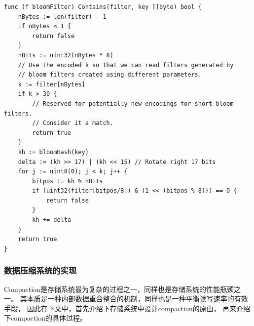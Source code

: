 \begin{enumerate}
\begin{lstlisting}[caption=Contain , label=code_radds_storage_tfile]
func (f bloomFilter) Contains(filter, key []byte) bool {
	nBytes := len(filter) - 1
	if nBytes < 1 {
	    return false
	}
	nBits := uint32(nBytes * 8)
	// Use the encoded k so that we can read filters generated by
	// bloom filters created using different parameters.
	k := filter[nBytes]
	if k > 30 {
	    // Reserved for potentially new encodings for short bloom filters.
	    // Consider it a match.
	    return true
	}
	kh := bloomHash(key)
	delta := (kh >> 17) | (kh << 15) // Rotate right 17 bits
	for j := uint8(0); j < k; j++ {
	    bitpos := kh % nBits
	    if (uint32(filter[bitpos/8]) & (1 << (bitpos % 8))) == 0 {
	        return false
	    }
	    kh += delta
	}
	return true
}
\end{lstlisting}

		\end{enumerate}

		\subsubsection{数据压缩系统的实现}
		
		Compaction是存储系统最为复杂的过程之一，同样也是存储系统的性能瓶颈之一。
		其本质是一种内部数据重合整合的机制，同样也是一种平衡读写速率的有效手段，
		因此在下文中，首先介绍下存储系统中设计compaction的原由，
		再来介绍下compaction的具体过程。

